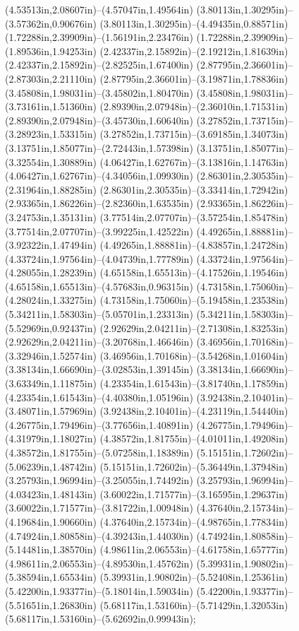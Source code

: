 (4.53513in,2.08607in)--(4.57047in,1.49564in) (3.80113in,1.30295in)--(3.57362in,0.90676in) (3.80113in,1.30295in)--(4.49435in,0.88571in) (1.72288in,2.39909in)--(1.56191in,2.23476in) (1.72288in,2.39909in)--(1.89536in,1.94253in) (2.42337in,2.15892in)--(2.19212in,1.81639in) (2.42337in,2.15892in)--(2.82525in,1.67400in) (2.87795in,2.36601in)--(2.87303in,2.21110in) (2.87795in,2.36601in)--(3.19871in,1.78836in) (3.45808in,1.98031in)--(3.45802in,1.80470in) (3.45808in,1.98031in)--(3.73161in,1.51360in) (2.89390in,2.07948in)--(2.36010in,1.71531in) (2.89390in,2.07948in)--(3.45730in,1.60640in) (3.27852in,1.73715in)--(3.28923in,1.53315in) (3.27852in,1.73715in)--(3.69185in,1.34073in) (3.13751in,1.85077in)--(2.72443in,1.57398in) (3.13751in,1.85077in)--(3.32554in,1.30889in) (4.06427in,1.62767in)--(3.13816in,1.14763in) (4.06427in,1.62767in)--(4.34056in,1.09930in) (2.86301in,2.30535in)--(2.31964in,1.88285in) (2.86301in,2.30535in)--(3.33414in,1.72942in) (2.93365in,1.86226in)--(2.82360in,1.63535in) (2.93365in,1.86226in)--(3.24753in,1.35131in) (3.77514in,2.07707in)--(3.57254in,1.85478in) (3.77514in,2.07707in)--(3.99225in,1.42522in) (4.49265in,1.88881in)--(3.92322in,1.47494in) (4.49265in,1.88881in)--(4.83857in,1.24728in) (4.33724in,1.97564in)--(4.04739in,1.77789in) (4.33724in,1.97564in)--(4.28055in,1.28239in) (4.65158in,1.65513in)--(4.17526in,1.19546in) (4.65158in,1.65513in)--(4.57683in,0.96315in) (4.73158in,1.75060in)--(4.28024in,1.33275in) (4.73158in,1.75060in)--(5.19458in,1.23538in) (5.34211in,1.58303in)--(5.05701in,1.23313in) (5.34211in,1.58303in)--(5.52969in,0.92437in) (2.92629in,2.04211in)--(2.71308in,1.83253in) (2.92629in,2.04211in)--(3.20768in,1.46646in) (3.46956in,1.70168in)--(3.32946in,1.52574in) (3.46956in,1.70168in)--(3.54268in,1.01604in) (3.38134in,1.66690in)--(3.02853in,1.39145in) (3.38134in,1.66690in)--(3.63349in,1.11875in) (4.23354in,1.61543in)--(3.81740in,1.17859in) (4.23354in,1.61543in)--(4.40380in,1.05196in) (3.92438in,2.10401in)--(3.48071in,1.57969in) (3.92438in,2.10401in)--(4.23119in,1.54440in) (4.26775in,1.79496in)--(3.77656in,1.40891in) (4.26775in,1.79496in)--(4.31979in,1.18027in) (4.38572in,1.81755in)--(4.01011in,1.49208in) (4.38572in,1.81755in)--(5.07258in,1.18389in) (5.15151in,1.72602in)--(5.06239in,1.48742in) (5.15151in,1.72602in)--(5.36449in,1.37948in) (3.25793in,1.96994in)--(3.25055in,1.74492in) (3.25793in,1.96994in)--(4.03423in,1.48143in) (3.60022in,1.71577in)--(3.16595in,1.29637in) (3.60022in,1.71577in)--(3.81722in,1.00948in) (4.37640in,2.15734in)--(4.19684in,1.90660in) (4.37640in,2.15734in)--(4.98765in,1.77834in) (4.74924in,1.80858in)--(4.39243in,1.44030in) (4.74924in,1.80858in)--(5.14481in,1.38570in) (4.98611in,2.06553in)--(4.61758in,1.65777in) (4.98611in,2.06553in)--(4.89530in,1.45762in) (5.39931in,1.90802in)--(5.38594in,1.65534in) (5.39931in,1.90802in)--(5.52408in,1.25361in) (5.42200in,1.93377in)--(5.18014in,1.59034in) (5.42200in,1.93377in)--(5.51651in,1.26830in) (5.68117in,1.53160in)--(5.71429in,1.32053in) (5.68117in,1.53160in)--(5.62692in,0.99943in);

